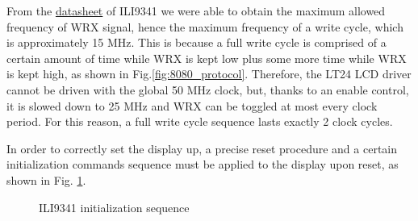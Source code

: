 \documentclass[11pt]{report}
\begin{document}
From the \href{https://cdn-shop.adafruit.com/datasheets/ILI9341.pdf}{datasheet} of ILI9341 we were able to obtain the maximum allowed frequency of WRX signal, hence the maximum frequency of a write cycle, which is approximately 15 MHz. This is because a full write cycle is comprised of a certain amount of time while WRX is kept low plus some more time while WRX is kept high, as shown in Fig.\ref{fig:8080_protocol}. Therefore, the LT24 LCD driver cannot be driven with the global 50 MHz clock, but, thanks to an enable control, it is slowed down to 25 MHz and WRX can be toggled at most every clock period. For this reason, a full write cycle sequence lasts exactly 2 clock cycles.

In order to correctly set the display up, a precise reset procedure and a certain initialization commands sequence must be applied to the display upon reset, as shown in Fig. \ref{fig:ili9341_initialization_seq}.

\begin{figure}[!h]
\centering
{}
\caption{ILI9341 initialization sequence}
\label{fig:ili9341_initialization_seq}
\end{figure}
\end{document}
